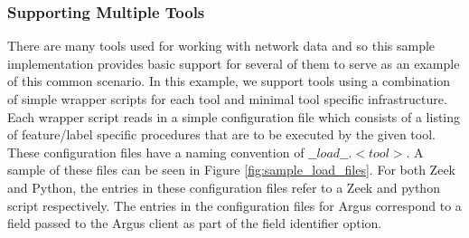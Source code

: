 \documentclass[sigconf]{acmart}
\begin{document}
\subsubsection{Supporting Multiple Tools}\label{subsubsec:tool_support}
There are many tools used for working with network data and so this sample implementation provides basic support for several of them to serve as an example of this common scenario.
In this example, we support tools using a combination of simple wrapper scripts for each tool and minimal tool specific infrastructure.
Each wrapper script reads in a simple configuration file which consists of a listing of feature/label specific procedures that are to be executed by the given tool.
These configuration files have a naming convention of $\_\_load\_\_.<tool>$.
A sample of these files can be seen in Figure \ref{fig:sample_load_files}.
For both Zeek and Python, the entries in these configuration files refer to a Zeek and python script respectively.
The entries in the configuration files for Argus correspond to a field passed to the Argus client as part of the field identifier option.
\end{document}
